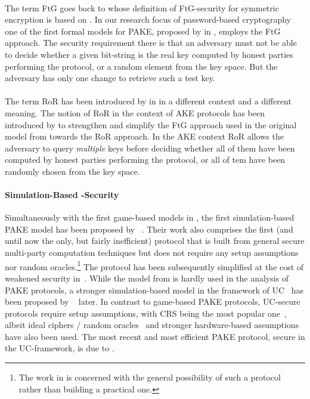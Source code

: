 \paragraph{}
The term \acl{FtG} goes back to \citeauthor{Bellare97} \cite{Bellare97} whose definition of \ac{FtG}-security for symmetric encryption is based on \cite{Goldwasser84} \cite{Micali86}.
In our research focus of password-based cryptography one of the first formal models for \ac{PAKE}, proposed by \citeauthor{Bellare2000} in \cite{Bellare2000}, employs the \ac{FtG} approach.
The security requirement there is that an adversary must not be able to decide whether a given bit-string is the real key computed by honest parties performing the protocol, or a random element from the key space.
But the adversary has only one change to retrieve such a test key.

\paragraph{}
The term \acl{RoR} has been introduced by \citeauthor{Bellare97} in \cite{Bellare97} in a different context and a different meaning.
The notion of \ac{RoR} in the context of \acl{AKE} protocols has been introduced by \citeauthor{Abdalla2005} to strengthen and simplify the \ac{FtG} approach used in the original model from \cite{Bellare2000} towards the \ac{RoR} approach.
In the \ac{AKE} context \ac{RoR} allows the adversary to query \emph{multiple} keys before deciding whether all of them have been computed by honest parties performing the protocol, or all of tem  have been randomly chosen from the key space.


\paragraph{Simulation-Based -Security}
Simultaneously with the first game-based models in \cite{Bellare2000,Boyko2000}, the first simulation-based \ac{PAKE} model has been proposed by \citeauthor{Goldreich01}~\cite{Goldreich01}.
Their work also comprises the first (and until now the only, but fairly inefficient) protocol that is built from general secure multi-party computation techniques but does not require any setup assumptions nor random oracles.\footnote{The work in \cite{Goldreich01} is concerned with the general possibility of such a protocol rather than building a practical one.}
The protocol has been subsequently simplified at the cost of weakened security in~\cite{NguyenV04}.
While the model from \cite{Goldreich01} is hardly used in the analysis of \ac{PAKE} protocols, a stronger simulation-based model in the framework of \acl{UC}~\cite{Canetti2001a} has been proposed by \citeauthor{Canetti2005}~\cite{Canetti2005} later.
In contrast to game-based \ac{PAKE} protocols, \ac{UC}-secure protocols require setup assumptions, with \ac{CRS} being the most popular one~\cite{Katz2011}, albeit ideal ciphers / random oracles~\cite{Abdalla2008} and stronger hardware-based assumptions~\cite{cryptoeprint:2012:537} have also been used.
The most recent and most efficient \ac{PAKE} protocol, secure in the \ac{UC}-framework, is due to \citeauthor{Benhamouda2013} \cite{Benhamouda2013}.

